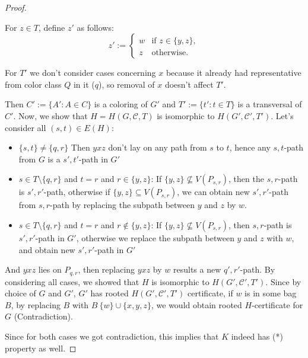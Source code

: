 \begin{proof}
\begin{itemize}
        For \( z \in T \), define \( z' \) as follows:
        \[
        z' :=
        \begin{cases}
        w & \text{if } z \in \{y, z\}, \\
        z & \text{otherwise}.
        \end{cases}
        \]

        For $T'$ we don't consider cases concerning $x$ because it already had representative from color class $Q$ in it ($q$),
        so removal of $x$ doesn't affect $T'$.
        
        Then \( C' := \{A' : A \in C\} \) is a coloring of \( G' \) and \( T' := \{t' : t \in T\} \) is a transversal of \( C' \). \newline
        Now, we show that $H = H(G, \mathcal{C}, T)$ is isomorphic to $H(G', \mathcal{C'}, T')$.
        Let's consider all $(s,t) \in E(H)$:
        \begin{itemize}
            \item  $\{s, t\} \neq \{q, r\}$
            Then $yxz$ don't lay on any path from $s$ to $t$, hence any $s, t$-path from $G$ is a $s', t'$-path in $G'$
            \item $s \in T \setminus \{q, r\}$ and $t = r$ and $r \in \{y, z\}$: \newline
            If $\{y, z\} \not\subseteq V(P_{s,r})$, then the $s,r$-path is $s',r'$-path, otherwise if $\{y, z\} \subseteq V(P_{s,r})$,
            we can obtain new $s', r'$-path from $s, r$-path by replacing the subpath between $y$ and $z$ by $w$.
            \item $s \in T \setminus \{q, r\}$ and $t = r$ and $r \not\in \{y, z\}$: \newline
            If $\{y, z\} \not\subseteq V(P_{s,r})$, then $s,r$-path is $s',r'$-path in $G'$, otherwise we replace the subpath between $y$ and $z$ with $w$,
            and obtain new $s', r'$-path in $G'$
        \end{itemize}
        And $yxz$ lies on $P_{q, r}$, then replacing $yxz$ by $w$ results a new $q',r'$-path.
        By considering all cases, we showed that $H$ is isomorphic to $H(G', \mathcal{C'}, T')$.
        Since by choice of $G$ and $G'$, $G'$ has rooted $H(G', \mathcal{C'}, T')$ certificate, if $w$ is in some bag $B$,
        by replacing $B$ with $B \ \{w\} \cup \{x, y, z\}$, we would obtain rooted $H$-certificate for $G$ (Contradiction).
    \end{itemize} 

    Since for both cases we got contradiction, this implies that $K$ indeed has (*) property as well.
\end{proof}